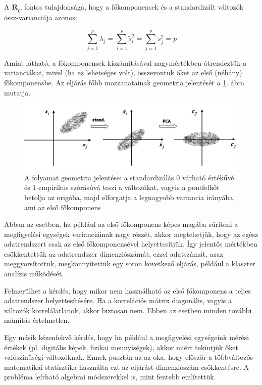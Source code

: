 \documentclass[a4paper,12pt]{article}
\begin{document}
A $\mathbf{\underline{R}}_C$ fontos tulajdonsága, hogy a főkomponensek és a standardizált változók össz-varianciája azonos:

$$\sum_{j=1}^p \lambda_j  = \sum_{i=1}^p \widetilde{s}_i^2 = \sum_{j=1}^p s_j^2
= p$$

Amint látható, a főkomponensek kiszámításával nagymértékben átrendeztük a varianciákat, mivel (ha ez lehetséges volt), összevontuk őket az első (néhány) főkomponensbe. Az eljárás főbb mozzanatainak geometria jelentését a \ref{fig:pca}. ábra mutatja.

\begin{figure}
	\centering
	\includegraphics[width=14cm]{pca.png}
	\caption{A folyamat geometria jelentése: a standardizálás $0$ várható értékűvé és $1$ empirikus szórásúvá teszi a változókat, vagyis a pontfelhőt betolja az origóba, majd elforgatja a legnagyobb variancia irányába, ami az első főkomponens}
	\label{fig:pca}
\end{figure}

Abban az esetben, ha például az első főkomponens képes magába sűríteni a megfigyelési egységek varianciáinak 
nagy részét, akkor megtehetjük, hogy az egész adatrendszert csak az első főkomponensével helyettesítjük. Így jelentős mértékben csökkentettük az adatrendszer dimenziószámát, ezzel adatszámát, azaz meggyorsítottuk, megkönnyítettük egy soron következő eljárás, például a klaszter analízis működését.


Felmerülhet a kérdés, hogy mikor nem használható az első főkomponens a teljes adatrendszer helyettesítésére. 
Ha a korrelációs mátrix diagonális, vagyis a változók korrelálatlanok, akkor biztosan nem. Ebben az esetben
minden további számítás értelmetlen.

Egy másik kézenfekvő kérdés, hogy ha például a megfigyelési egységeink mérési értékek (pl. digitális képek, fizikai
mennyiségek), akkor miért tekintjük őket valószínűségi változóknak. Ennek pusztán az az oka, hogy először a többváltozós matematikai statisztika használta ezt az eljárást dimenziószám csökkentésre. A probléma leírható algebrai módszerekkel is, mint fentebb említettük.
\end{document}
